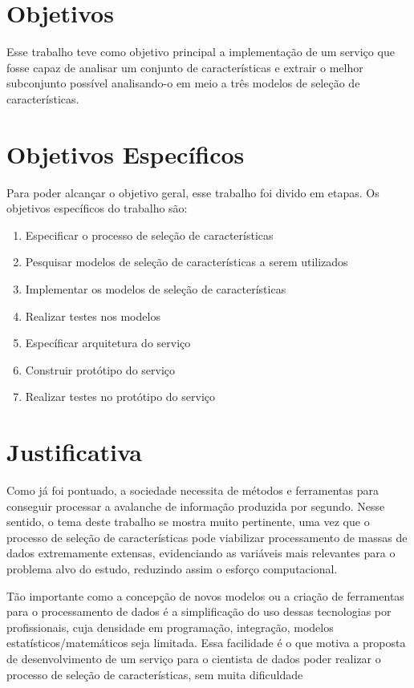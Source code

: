 \section{Objetivos}

Esse trabalho teve como objetivo principal a implementação de um serviço que fosse capaz de analisar um conjunto de características e extrair o melhor subconjunto possível analisando-o em meio a três modelos de seleção de características.

\section{Objetivos Específicos}

Para poder alcançar o objetivo geral, esse trabalho foi divido em etapas. Os objetivos específicos do trabalho são:

\begin{enumerate}
	\item{Especificar o processo de seleção de características}
	\item{Pesquisar modelos de seleção de características a serem utilizados}
	\item{Implementar os modelos de seleção de características}
	\item{Realizar testes nos modelos}
	\item{Específicar arquitetura do serviço}
	\item{Construir protótipo do serviço}
	\item{Realizar testes no protótipo do serviço}
\end{enumerate}


\section{Justificativa}

Como já foi pontuado, a sociedade necessita de métodos e ferramentas para conseguir processar a avalanche de informação produzida por segundo. Nesse sentido, o tema deste trabalho se mostra muito pertinente, uma vez que o processo de seleção de características pode viabilizar processamento de massas de dados extremamente extensas, evidenciando as variáveis mais relevantes para o problema alvo do estudo, reduzindo assim o esforço computacional. 

Tão importante como a concepção de novos modelos ou a criação de ferramentas para o processamento de dados é a simplificação do uso dessas tecnologias por profissionais, cuja densidade em programação, integração, modelos estatísticos/matemáticos seja limitada. Essa facilidade é o que motiva a proposta de desenvolvimento de um serviço para o cientista de dados poder realizar o processo de seleção de características, sem muita dificuldade

